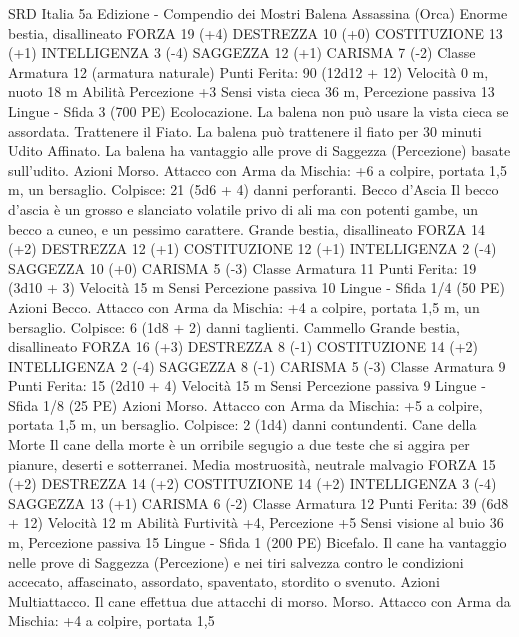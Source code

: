 \begin{multicols}{2}
SRD Italia 5a Edizione - Compendio dei Mostri
Balena Assassina
(Orca)
Enorme bestia, disallineato
FORZA 19 (+4)
DESTREZZA 10 (+0)
COSTITUZIONE 13 (+1)
INTELLIGENZA 3 (-4)
SAGGEZZA 12 (+1)
CARISMA 7 (-2)
Classe Armatura 12 (armatura naturale)
\hspace*{0pt}\hfill{Punti Ferita}: 90 (12d12 + 12)
Velocità 0 m, nuoto 18 m
Abilità Percezione +3
Sensi vista cieca 36 m, Percezione passiva 13
Lingue -
Sfida 3 (700 PE)
Ecolocazione. La balena non può usare la vista cieca se
assordata.
Trattenere il Fiato. La balena può trattenere il fiato per 30
minuti
Udito Affinato. La balena ha vantaggio alle prove di Saggezza
(Percezione) basate sull’udito.
Azioni
Morso. Attacco con Arma da Mischia: +6 a colpire, portata 1,5
m, un bersaglio.
Colpisce: 21 (5d6 + 4) danni perforanti.
Becco d’Ascia
Il becco d’ascia è un grosso e slanciato volatile privo di
ali ma con potenti gambe, un becco a cuneo, e un
pessimo carattere.
Grande bestia, disallineato
FORZA 14 (+2)
DESTREZZA 12 (+1)
COSTITUZIONE 12 (+1)
INTELLIGENZA 2 (-4)
SAGGEZZA 10 (+0)
CARISMA 5 (-3)
Classe Armatura 11
\hspace*{0pt}\hfill{Punti Ferita}: 19 (3d10 + 3)
Velocità 15 m
Sensi Percezione passiva 10
Lingue -
Sfida 1/4 (50 PE)
Azioni
Becco. Attacco con Arma da Mischia: +4 a colpire, portata 1,5
m, un bersaglio.
Colpisce: 6 (1d8 + 2) danni taglienti.
Cammello
Grande bestia, disallineato
FORZA 16 (+3)
DESTREZZA 8 (-1)
COSTITUZIONE 14 (+2)
INTELLIGENZA 2 (-4)
SAGGEZZA 8 (-1)
CARISMA 5 (-3)
Classe Armatura 9
\hspace*{0pt}\hfill{Punti Ferita}: 15 (2d10 + 4)
Velocità 15 m
Sensi Percezione passiva 9
Lingue -
Sfida 1/8 (25 PE)
Azioni
Morso. Attacco con Arma da Mischia: +5 a colpire, portata 1,5
m, un bersaglio.
Colpisce: 2 (1d4) danni contundenti.
Cane della Morte
Il cane della morte è un orribile segugio a due teste che
si aggira per pianure, deserti e sotterranei.
Media mostruosità, neutrale malvagio
FORZA 15 (+2)
DESTREZZA 14 (+2)
COSTITUZIONE 14 (+2)
INTELLIGENZA 3 (-4)
SAGGEZZA 13 (+1)
CARISMA 6 (-2)
Classe Armatura 12
\hspace*{0pt}\hfill{Punti Ferita}: 39 (6d8 + 12)
Velocità 12 m
Abilità Furtività +4, Percezione +5
Sensi visione al buio 36 m, Percezione passiva 15
Lingue -
Sfida 1 (200 PE)
Bicefalo. Il cane ha vantaggio nelle prove di Saggezza
(Percezione) e nei tiri salvezza contro le condizioni accecato,
affascinato, assordato, spaventato, stordito o svenuto.
Azioni
Multiattacco. Il cane effettua due attacchi di morso.
Morso. Attacco con Arma da Mischia: +4 a colpire, portata 1,5

\end{multicols}
